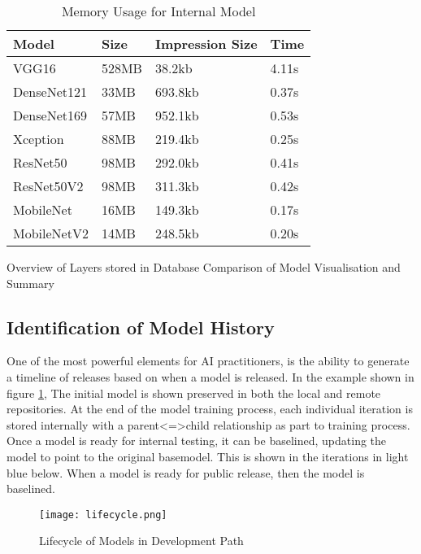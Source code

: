 \begin{table}[!ht]
    \centering
    \caption{Memory Usage for Internal Model}
    \label{table:memory}
    \setlength\tabcolsep{0pt} %
    \begin{tabular}{@{} p{2cm} p{2cm} p{2cm} p{1cm}  @{}}
        \hline
        Model & Size & Impression Size & Time\\
        \hline
        VGG16       & 528MB & 38.2kb & 4.11s \\
        DenseNet121	& 33MB & 693.8kb & 0.37s \\
        DenseNet169	& 57MB & 952.1kb & 0.53s \\
        Xception	& 88MB & 219.4kb & 0.25s \\
        ResNet50	& 98MB & 292.0kb & 0.41s \\
        ResNet50V2	& 98MB & 311.3kb & 0.42s \\
        MobileNet	& 16MB & 149.3kb & 0.17s \\
        MobileNetV2	& 14MB & 248.5kb & 0.20s \\
        \hline
    \end{tabular}
\end{table}

    Overview of Layers stored in Database
    Comparison of Model Visualisation and Summary

\subsection{Identification of Model History}

One of the most powerful elements for AI practitioners, is the ability to generate a timeline of releases based on when a model is released. In the example shown in figure \ref{fig:lifecycle_in real}, The initial model is shown preserved in both the local and remote repositories. At the end of the model training process, each individual iteration is stored internally with a parent<=>child relationship as part to training process. Once a model is ready for internal testing, it can be baselined, updating the model to point to the original basemodel. This is shown in the iterations in light blue below. When a model is ready for public release, then the model is baselined.

\begin{figure}[!t]
    \centering
    \texttt{[image: lifecycle.png]}
    \caption{Lifecycle of Models in Development Path}
    \label{fig:lifecycle_in real}
\end{figure}


